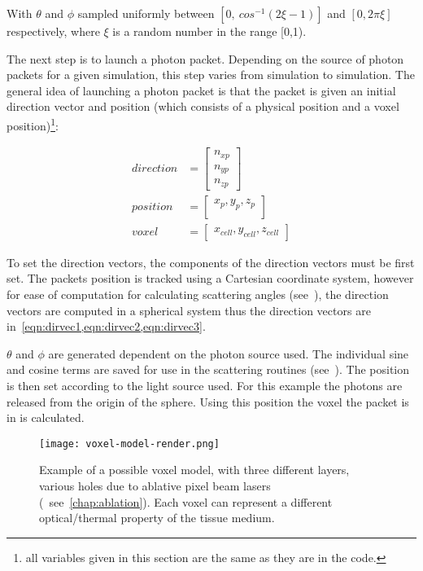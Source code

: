 With $\theta$ and $\phi$ sampled uniformly between $[0,\ cos^{-1}(2\xi-1)]$ and $[0,2\pi\xi]$ respectively, where $\xi$ is a random number in the range [0,1).

The next step is to launch a photon packet. 
Depending on the source of photon packets for a given simulation, this step varies from simulation to simulation. 
The general idea of launching a photon packet is that the packet is given an initial direction vector and position (which consists of a physical position and a voxel position)\footnote{all variables given in this section are the same as they are in the code.}:

\begin{align}
	direction &= \begin{bmatrix}
		n_{xp}\\
		n_{yp}\\
		n_{zp}
	\end{bmatrix}\\
	position &= \begin{bmatrix}
		x_p, y_p, z_p\\
	\end{bmatrix}\\
	voxel &= \begin{bmatrix}
		x_{cell}, y_{cell}, z_{cell}
	\end{bmatrix}	 
\end{align}

To set the direction vectors, the components of the direction vectors must be first set. The packets position is tracked using a Cartesian coordinate system, however for ease of computation for calculating scattering angles (see~), the direction vectors are computed in a spherical system thus the direction vectors are in~\cref{eqn:dirvec1,eqn:dirvec2,eqn:dirvec3}. 

$\theta$ and $\phi$ are generated dependent on the photon source used. The individual sine and cosine terms are saved for use in the scattering routines (see~).
The position is then set according to the light source used.
For this example the photons are released from the origin of the sphere.
Using this position the voxel the packet is in is calculated.
\FloatBarrier

\begin{figure}[!htbp]
\centering
\texttt{[image: voxel-model-render.png]}
\caption{Example of a possible voxel model, with three different layers, various holes due to ablative pixel beam lasers (~see~\cref{chap:ablation}). Each voxel can represent a different optical/thermal property of the tissue medium.}
\label{fig:voxel-model}
\vspace{-20pt}
\end{figure}
